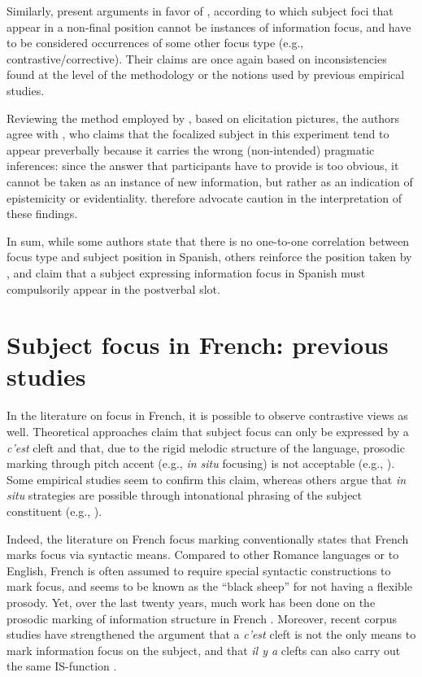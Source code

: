 Similarly, \textcite{vidal2019nota} present arguments in favor of \textcite{zubizarreta1998prosody}, according to which subject foci that appear in a non-final position cannot be instances of information focus, and have to be considered occurrences of some other focus type (e.g., contrastive/corrective). Their claims are once again based on inconsistencies found at the level of the methodology or the notions used by previous empirical studies. 

Reviewing the method employed by \textcite{gabriel2007fokus}, based on elicitation pictures, the authors agree with \textcite{uth2014spanish}, who claims that the focalized subject in this experiment tend to appear preverbally because it carries the wrong (non-intended) pragmatic inferences: since the answer that participants have to provide is too obvious, it cannot be taken as an instance of new information, but rather as an indication of epistemicity or evidentiality. \textcite{vidal2019nota} therefore advocate caution in the interpretation of these findings. 

In sum, while some authors state that there is no one-to-one correlation between focus type and subject position in Spanish, others reinforce the position taken by \textcite{zubizarreta1998prosody}, and claim that a subject expressing information focus in Spanish must compulsorily appear in the postverbal slot.
 
 \section{Subject focus in French: previous studies}
In the literature on focus in French, it is possible to observe contrastive views as well. Theoretical approaches claim that subject focus can only be expressed by a \textit{c'est} cleft and that, due to the rigid melodic structure of the language, prosodic marking through pitch accent (e.g., \textit{in situ} focusing) is not acceptable (e.g., \cite{lambrecht1996information}). Some empirical studies seem to confirm this claim, whereas others argue that \textit{in situ} strategies are possible through intonational phrasing of the subject constituent (e.g., \cite{fery2001focus}). 

Indeed, the literature on French focus marking conventionally states that French marks focus via syntactic means. Compared to other Romance
 languages or  to  English,  French  is  often  assumed  to  require  special syntactic constructions to mark focus, and seems to be known as the ``black sheep” for not having a flexible prosody.  Yet, over the last twenty years, much work has been done  on  the  prosodic  marking of  information  structure  in  French \parencite{jun2000phonological, fery2001focus, beyssade2015prosodic}.
 Moreover, recent corpus studies have strengthened the argument that a \textit{c'est} cleft is not the only means to mark information focus on the subject, and that \textit{il y a} clefts can also carry out the same IS-function \parencite{karssenberg2017oiseaux, Karssenberg2018}. 
 
